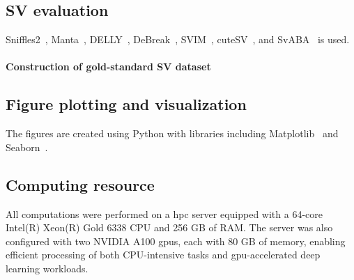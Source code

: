 \documentclass[pdflatex,sn-nature]{sn-jnl}%
\theoremstyle{thmstyleone}%
\theoremstyle{thmstyletwo}%
\theoremstyle{thmstylethree}%
\begin{document}
\subsection*{SV evaluation}

Sniffles2~\cite{Sedlazeck2018, Smolka2024}, Manta~\cite{chen2016manta}, DELLY~\cite{rausch2012delly}, DeBreak~\cite{chen2023deciphering}, SVIM~\cite{heller2019svim}, cuteSV~\cite{jiang2020longreadbased}, and SvABA~\cite{wala2018svaba} is used.

\paragraph*{Construction of gold-standard SV dataset}

\subsection*{Figure plotting and visualization}

The figures are created using Python with libraries including Matplotlib~\cite{Hunter2007} and Seaborn~\cite{Waskom2021}.

\subsection*{Computing resource}

All computations were performed on a \gls{hpc} server equipped with a 64-core Intel(R) Xeon(R) Gold 6338 CPU and 256 GB of RAM.
The server was also configured with two NVIDIA A100 \glspl{gpu}, each with 80 GB of memory, enabling efficient processing of both CPU-intensive tasks and \gls{gpu}-accelerated deep learning workloads.

\backmatter


\makeatletter
\renewcommand{\theHfigure}{extended.\thefigure}
\renewcommand{\theHtable}{extended.\thetable}
\makeatother

\renewcommand{\figurename}{Extended Data Fig.}
\renewcommand{\tablename}{Extended Data Table}
\setcounter{figure}{0}
\setcounter{table}{0}
\end{document}
